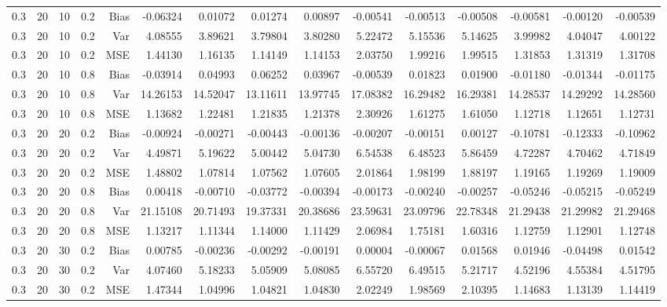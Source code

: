 \begin{table}[!htbp]
\begin{tabular}{lrrrrrrrrrrrrrr}
0.3 &  20 & 10 & 0.2 & Bias & -0.06324 & 0.01072 & 0.01274 & 0.00897 & -0.00541 & -0.00513 & -0.00508 & -0.00581 & -0.00120 & -0.00539 \\
0.3 &  20 & 10 & 0.2 & Var & 4.08555 & 3.89621 & 3.79804 & 3.80280 & 5.22472 & 5.15536 & 5.14625 & 3.99982 & 4.04047 & 4.00122 \\
0.3 &  20 & 10 & 0.2 & MSE & 1.44130 & 1.16135 & 1.14149 & 1.14153 & 2.03750 & 1.99216 & 1.99515 & 1.31853 & 1.31319 & 1.31708 \\
0.3 &  20 & 10 & 0.8 & Bias & -0.03914 & 0.04993 & 0.06252 & 0.03967 & -0.00539 & 0.01823 & 0.01900 & -0.01180 & -0.01344 & -0.01175 \\
0.3 &  20 & 10 & 0.8 & Var & 14.26153 & 14.52047 & 13.11611 & 13.97745 & 17.08382 & 16.29482 & 16.29381 & 14.28537 & 14.29292 & 14.28560 \\
0.3 &  20 & 10 & 0.8 & MSE & 1.13682 & 1.22481 & 1.21835 & 1.21378 & 2.30926 & 1.61275 & 1.61050 & 1.12718 & 1.12651 & 1.12731 \\
0.3 &  20 & 20 & 0.2 & Bias & -0.00924 & -0.00271 & -0.00443 & -0.00136 & -0.00207 & -0.00151 & 0.00127 & -0.10781 & -0.12333 & -0.10962 \\
0.3 &  20 & 20 & 0.2 & Var & 4.49871 & 5.19622 & 5.00442 & 5.04730 & 6.54538 & 6.48523 & 5.86459 & 4.72287 & 4.70462 & 4.71849 \\
0.3 &  20 & 20 & 0.2 & MSE & 1.48802 & 1.07814 & 1.07562 & 1.07605 & 2.01864 & 1.98199 & 1.88197 & 1.19165 & 1.19269 & 1.19009 \\
0.3 &  20 & 20 & 0.8 & Bias & 0.00418 & -0.00710 & -0.03772 & -0.00394 & -0.00173 & -0.00240 & -0.00257 & -0.05246 & -0.05215 & -0.05249 \\
0.3 &  20 & 20 & 0.8 & Var & 21.15108 & 20.71493 & 19.37331 & 20.38686 & 23.59631 & 23.09796 & 22.78348 & 21.29438 & 21.29982 & 21.29468 \\
0.3 &  20 & 20 & 0.8 & MSE & 1.13217 & 1.11344 & 1.14000 & 1.11429 & 2.06984 & 1.75181 & 1.60316 & 1.12759 & 1.12901 & 1.12748 \\
0.3 &  20 & 30 & 0.2 & Bias & 0.00785 & -0.00236 & -0.00292 & -0.00191 & 0.00004 & -0.00067 & 0.01568 & 0.01946 & -0.04498 & 0.01542 \\
0.3 &  20 & 30 & 0.2 & Var & 4.07460 & 5.18233 & 5.05909 & 5.08085 & 6.55720 & 6.49515 & 5.21717 & 4.52196 & 4.55384 & 4.51795 \\
0.3 &  20 & 30 & 0.2 & MSE & 1.47344 & 1.04996 & 1.04821 & 1.04830 & 2.02249 & 1.98569 & 2.10395 & 1.14683 & 1.13139 & 1.14419 \\

\end{tabular}
\end{table}
